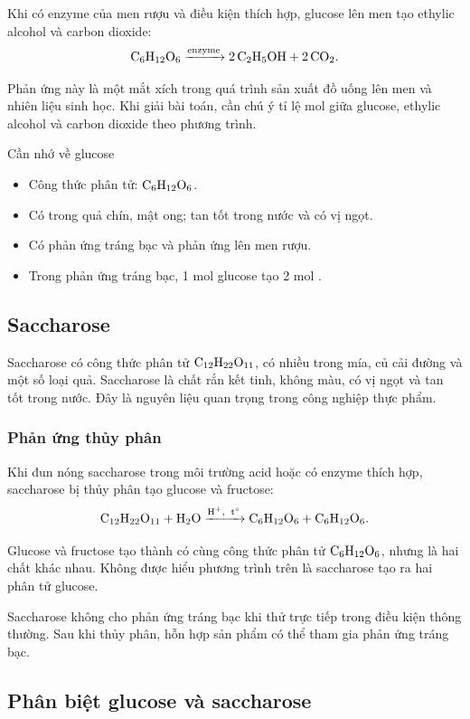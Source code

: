 Khi có enzyme của men rượu và điều kiện thích hợp, glucose lên men tạo ethylic alcohol và carbon dioxide:
\[
\ce{C6H12O6 ->[enzyme] 2C2H5OH + 2CO2}.
\]

Phản ứng này là một mắt xích trong quá trình sản xuất đồ uống lên men và nhiên liệu sinh học. Khi giải bài toán, cần chú ý tỉ lệ mol giữa glucose, ethylic alcohol và carbon dioxide theo phương trình.

\begin{ghinho}{Cần nhớ về glucose}
\begin{itemize}
\item Công thức phân tử: \(\ce{C6H12O6}\).
\item Có trong quả chín, mật ong; tan tốt trong nước và có vị ngọt.
\item Có phản ứng tráng bạc và phản ứng lên men rượu.
\item Trong phản ứng tráng bạc, 1 mol glucose tạo 2 mol .
\end{itemize}
\end{ghinho}

\subsection{Saccharose}

Saccharose có công thức phân tử \(\ce{C12H22O11}\), có nhiều trong mía, củ cải đường và một số loại quả. Saccharose là chất rắn kết tinh, không màu, có vị ngọt và tan tốt trong nước. Đây là nguyên liệu quan trọng trong công nghiệp thực phẩm.

\subsubsection*{Phản ứng thủy phân}

Khi đun nóng saccharose trong môi trường acid hoặc có enzyme thích hợp, saccharose bị thủy phân tạo glucose và fructose:
\[
\ce{C12H22O11 + H2O ->[H^+,\ t^\circ] C6H12O6 + C6H12O6}.
\]

Glucose và fructose tạo thành có cùng công thức phân tử \(\ce{C6H12O6}\), nhưng là hai chất khác nhau. Không được hiểu phương trình trên là saccharose tạo ra hai phân tử glucose.

Saccharose không cho phản ứng tráng bạc khi thử trực tiếp trong điều kiện thông thường. Sau khi thủy phân, hỗn hợp sản phẩm có thể tham gia phản ứng tráng bạc.

\subsection{Phân biệt glucose và saccharose}

